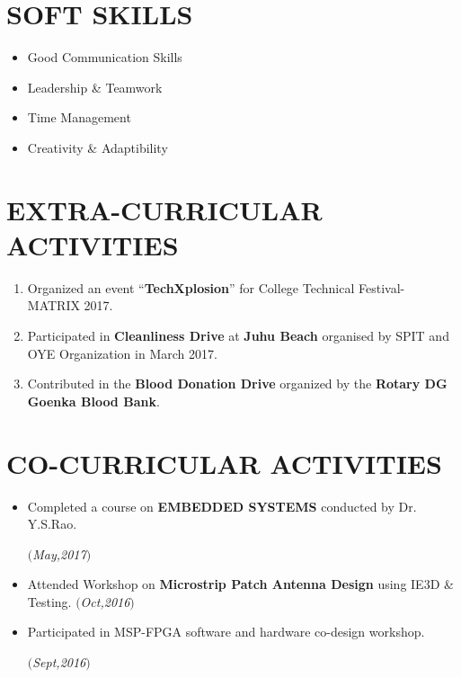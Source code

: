 \documentclass[margin]{res}
\begin{document}
\begin{resume}
\section{SOFT SKILLS}
\begin{itemize}

\item Good Communication Skills
\item Leadership \& Teamwork
\item Time Management
\item Creativity \& Adaptibility

\end{itemize}

\section{EXTRA-CURRICULAR ACTIVITIES}
\begin{enumerate}

\item Organized an event “\textbf{TechXplosion}” for College Technical Festival- MATRIX 2017.
\item  Participated in \textbf{Cleanliness Drive} at \textbf{Juhu Beach} organised by SPIT and OYE Organization in March 2017.
\item Contributed in the \textbf{Blood Donation Drive} organized by the \textbf{Rotary DG Goenka Blood Bank}.

\end{enumerate}

\section{CO-CURRICULAR ACTIVITIES}
\begin{itemize}
\item Completed a course on \textbf{EMBEDDED SYSTEMS} conducted by Dr. Y.S.Rao.  \hfill    \begin{flushright}\textit{$($May,2017$)$}
\end{flushright}
\item  Attended  Workshop on \textbf{Microstrip Patch Antenna Design} using IE3D \& Testing. \hfill \textit{$($Oct,2016$)$}

\item Participated in MSP-FPGA software and hardware co-design workshop.  \begin{flushright}   \textit{$($Sept,2016$)$}
\end{flushright}
\end{itemize}

\end{resume}
\end{document}
